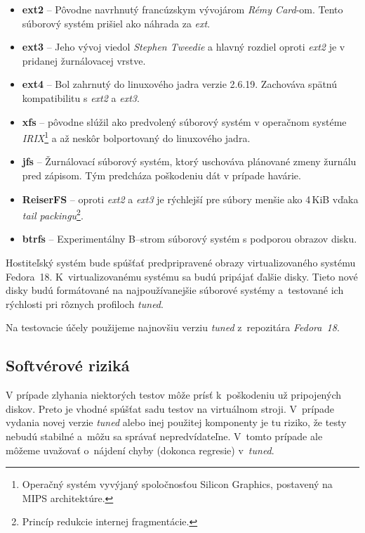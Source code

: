 \begin{itemize}
    \item \textbf{ext2} -- Pôvodne navrhnutý francúzskym vývojárom \emph{Rémy
    Card}-om. Tento súborový systém prišiel ako náhrada za \emph{ext}.
    \item \textbf{ext3} -- Jeho vývoj viedol \emph{Stephen Tweedie} a hlavný
    rozdiel oproti \emph{ext2} je v pridanej žurnálovacej vrstve.
    \item \textbf{ext4} -- Bol zahrnutý do linuxového jadra verzie 2.6.19.
    Zachováva spätnú kompatibilitu s \emph{ext2} a \emph{ext3}.
    \item \textbf{xfs} -- pôvodne slúžil ako predvolený súborový systém v
    operačnom systéme \emph{IRIX}\footnote{Operačný systém vyvýjaný
    spoločnosťou Silicon Graphics, postavený na MIPS architektúre.} a až neskôr
    bolportovaný do linuxového jadra.
    \item \textbf{jfs} -- Žurnálovací súborový systém, ktorý uschováva
    plánované zmeny žurnálu pred zápisom. Tým predcháza poškodeniu dát v
    prípade havárie.
    \item \textbf{ReiserFS} -- oproti \emph{ext2} a \emph{ext3} je rýchlejší
    pre súbory menšie ako 4\,KiB vďaka \emph{tail packingu}\footnote{Princíp
    redukcie internej fragmentácie.}.
    \item \textbf{btrfs} -- Experimentálny B--strom súborový systém s podporou
    obrazov disku.
\end{itemize}

Hostiteľský systém bude spúšťať predpripravené obrazy virtualizovaného systému
Fedora~18. K~virtualizovanému systému sa budú pripájať ďalšie disky. Tieto nové
disky budú formátované na najpoužívanejšie súborové systémy a~testované ich
rýchlosti pri rôznych profiloch \emph{tuned}.

Na testovacie účely použijeme najnovšiu verziu \emph{tuned} z~repozitára
\emph{Fedora~18}.

\subsection*{Softvérové riziká}
\label{sec:softverove-rizika}

V prípade zlyhania niektorých testov môže prísť k~poškodeniu už pripojených
diskov. Preto je vhodné spúšťat sadu testov na virtuálnom stroji. V~prípade
vydania novej verzie \emph{tuned} alebo inej použitej komponenty je tu riziko,
že testy nebudú stabilné a~môžu sa správať nepredvídateľne. V~tomto prípade ale
môžeme uvažovať o~nájdení chyby (dokonca regresie) v~\emph{tuned}.


